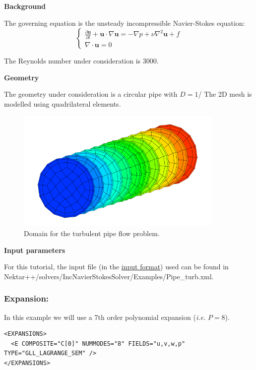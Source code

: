 \textbf{Background}

The governing equation is the unsteady incompressible Navier-Stokes equation:
\begin{equation}
\begin{cases}
\frac{\partial \textbf{u}}{\partial t} + \textbf{u} \cdot \nabla \textbf{u} = - \nabla p + \nu \nabla^2 \textbf{u} + f \\
\nabla \cdot \textbf{u} = 0
\label{IncNS_equations}
\end{cases}
\end{equation}

The Reynolds number under consideration is 3000.

\textbf{Geometry}

The geometry under consideration is a circular pipe with $D=1$/ The 2D mesh is modelled using quadrilateral elements. 

\begin{figure}
\begin{center}
\includegraphics[width=10cm]{Figures/PipeDomain.png}
\caption{Domain for the turbulent pipe flow problem.}
\end{center}
\end{figure}

\textbf{Input parameters}

For this tutorial, the input file (in the \hyperref[XMLformat]{\nekpp input format}) used can be found in Nektar++/solvers/IncNavierStokesSolver/Examples/Pipe\_turb.xml.

\subsubsection{Expansion:~} In this example we will use a 7th order polynomial expansion (\textit{i.e.} $P=8$).
\begin{lstlisting}[style=XMLStyle]
<EXPANSIONS>
  <E COMPOSITE="C[0]" NUMMODES="8" FIELDS="u,v,w,p" TYPE="GLL_LAGRANGE_SEM" />
</EXPANSIONS>
\end{lstlisting}

